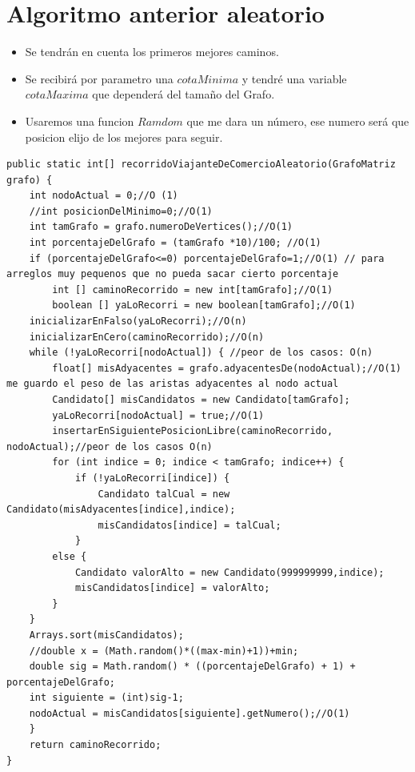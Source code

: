 \documentclass[a4paper,11pt]{article}
\begin{document}
\section{Algoritmo anterior aleatorio}
\begin{itemize}
  \item Se tendrán en cuenta los primeros mejores caminos.
  \item Se recibirá por parametro una $cotaMinima$ y tendré una variable $cotaMaxima$ que dependerá del tamaño del Grafo.
  \item Usaremos una funcion $Ramdom$ que me dara un número, ese numero será que posicion elijo de los mejores para seguir.
\end{itemize}
 \lstset{language=Java, breaklines=true, basicstyle=\footnotesize}
\begin{lstlisting}[frame=single]
  public static int[] recorridoViajanteDeComercioAleatorio(GrafoMatriz grafo) {
  	int nodoActual = 0;//O (1)
	//int posicionDelMinimo=0;//O(1)
	int tamGrafo = grafo.numeroDeVertices();//O(1)
	int porcentajeDelGrafo = (tamGrafo *10)/100; //O(1)
	if (porcentajeDelGrafo<=0) porcentajeDelGrafo=1;//O(1) // para arreglos muy pequenos que no pueda sacar cierto porcentaje
		int [] caminoRecorrido = new int[tamGrafo];//O(1)
		boolean [] yaLoRecorri = new boolean[tamGrafo];//O(1)
	inicializarEnFalso(yaLoRecorri);//O(n)
	inicializarEnCero(caminoRecorrido);//O(n)
	while (!yaLoRecorri[nodoActual]) { //peor de los casos: O(n)
		float[] misAdyacentes = grafo.adyacentesDe(nodoActual);//O(1) me guardo el peso de las aristas adyacentes al nodo actual
		Candidato[] misCandidatos = new Candidato[tamGrafo];
		yaLoRecorri[nodoActual] = true;//O(1)
		insertarEnSiguientePosicionLibre(caminoRecorrido, nodoActual);//peor de los casos O(n)
		for (int indice = 0; indice < tamGrafo; indice++) {
			if (!yaLoRecorri[indice]) {
				Candidato talCual = new Candidato(misAdyacentes[indice],indice);
				misCandidatos[indice] = talCual;
			}
		else {
			Candidato valorAlto = new Candidato(999999999,indice);
			misCandidatos[indice] = valorAlto;
		}
	}
	Arrays.sort(misCandidatos);
	//double x = (Math.random()*((max-min)+1))+min;
	double sig = Math.random() * ((porcentajeDelGrafo) + 1) + porcentajeDelGrafo;
	int siguiente = (int)sig-1;
	nodoActual = misCandidatos[siguiente].getNumero();//O(1)
	}
	return caminoRecorrido;
}

\end{lstlisting}
\end{document}
